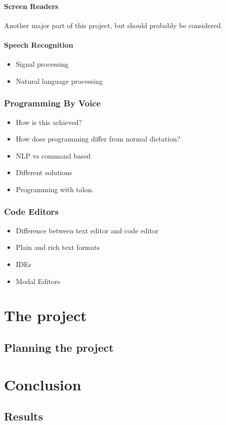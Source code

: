 \documentclass[a4paper,english]{ifimaster}
\begin{document}
\subsection{Screen Readers}
Another major part of this project, but should probably be considered.

\subsection{Speech Recognition}
\begin{itemize}
    \item{Signal processing}
    \item{Natural language processing}
\end{itemize}



\section{Programming By Voice}
\begin{itemize}
    \item{How is this achieved?}
    \item{How does programming differ from normal dictation?}
    \item{NLP vs command based}
    \item{Different solutions}
    \item{Programming with talon.}
\end{itemize}



\section{Code Editors}
\begin{itemize}
    \item{Difference between text editor and code editor}
    \item{Plain and rich text formats}
    \item{IDEs}
    \item{Modal Editors}
\end{itemize}


\part{The project}

\chapter{Planning the project}

\part{Conclusion}

\chapter{Results}

\backmatter{}

\printbibliography
\end{document}
